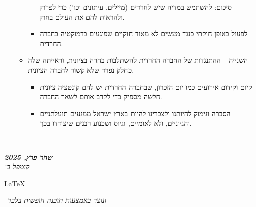 \documentclass[]{article}
\newcommand\en[1] {\begin{otherlanguage}{english}#1\end{otherlanguage}}
\newcommand\ndoc  {\dotfill \\ \vfil {\begin{center}
            {\textbf{\textit{שחר פרץ, 2025}} \\
                \scriptsize \textit{קומפל ב־}\en{\LaTeX}\,\textit{ ונוצר באמצעות תוכנה חופשית בלבד}}
    \end{center}} \vfil	}
\begin{document}
\begin{enumerate}
\begin{itemize}
\begin{itemize}
                סיכום: להשתמש במדיה שיש לחרדים (מיילים, עיתונים וכו') כדי לפרוץ ולהראות להם את העולם בחוץ. 
                \item לפעול באופן חוקתי כנגד מעשים לא מאוד חוקיים שפוגעים בדמוקטיה בחברה החרדית. 
            \end{itemize}
            \item השנייה – ההתנגדות של החברה החרדית להשתלבות בחרה בציונית, וראייתה שלה כחלק נפרד שלא קשור לחברה הציונית. 
            \begin{itemize}
                \item קיום וקידום אירועים כמו יום הזכרון, שבחברה החרדית יש להם קונטציה ציונית חלשה מספיק כדי לקרב אותם לשאר החברה. 
                \item הסברה ונימוק להיותנו ולצכרינו להיות בארץ ישראל ממנעים תועלתניים והגיוניים, ולא לאומיים, וגיוס ושכנוע רבנים שיצודדו בכך. 
            \end{itemize}
        \end{itemize}
    \end{enumerate}
    
    
    
    \ndoc
\end{document}
